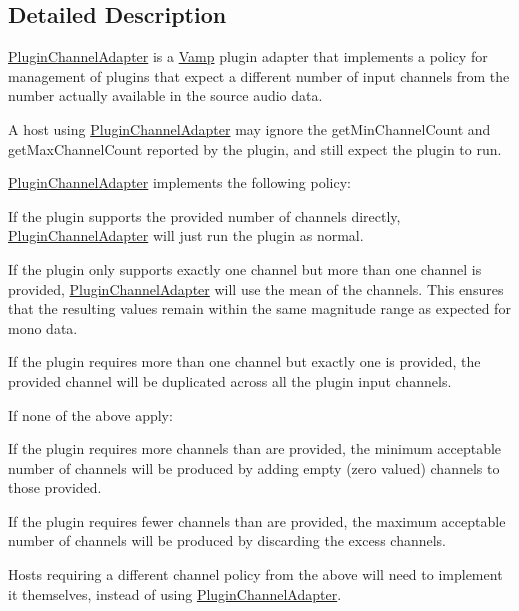 \subsection{Detailed Description}
\hyperlink{class_vamp_1_1_host_ext_1_1_plugin_channel_adapter}{Plugin\+Channel\+Adapter} is a \hyperlink{namespace_vamp}{Vamp} plugin adapter that implements a policy for management of plugins that expect a different number of input channels from the number actually available in the source audio data.

A host using \hyperlink{class_vamp_1_1_host_ext_1_1_plugin_channel_adapter}{Plugin\+Channel\+Adapter} may ignore the get\+Min\+Channel\+Count and get\+Max\+Channel\+Count reported by the plugin, and still expect the plugin to run.

\hyperlink{class_vamp_1_1_host_ext_1_1_plugin_channel_adapter}{Plugin\+Channel\+Adapter} implements the following policy\+:


\begin{DoxyItemize}
\item If the plugin supports the provided number of channels directly, \hyperlink{class_vamp_1_1_host_ext_1_1_plugin_channel_adapter}{Plugin\+Channel\+Adapter} will just run the plugin as normal.
\item If the plugin only supports exactly one channel but more than one channel is provided, \hyperlink{class_vamp_1_1_host_ext_1_1_plugin_channel_adapter}{Plugin\+Channel\+Adapter} will use the mean of the channels. This ensures that the resulting values remain within the same magnitude range as expected for mono data.
\item If the plugin requires more than one channel but exactly one is provided, the provided channel will be duplicated across all the plugin input channels.
\end{DoxyItemize}

If none of the above apply\+:


\begin{DoxyItemize}
\item If the plugin requires more channels than are provided, the minimum acceptable number of channels will be produced by adding empty (zero valued) channels to those provided.
\item If the plugin requires fewer channels than are provided, the maximum acceptable number of channels will be produced by discarding the excess channels.
\end{DoxyItemize}

Hosts requiring a different channel policy from the above will need to implement it themselves, instead of using \hyperlink{class_vamp_1_1_host_ext_1_1_plugin_channel_adapter}{Plugin\+Channel\+Adapter}.

